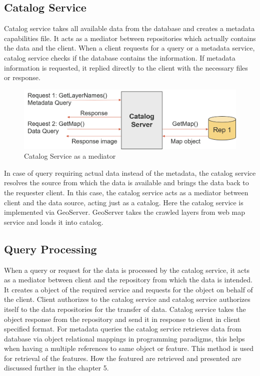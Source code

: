 \subsection{Catalog Service}
Catalog service takes all available data from the database and creates a metadata capabilities file. It acts as a mediator between repositories which actually contains the data and the client. When a client requests for a query or a metadata service, catalog service checks if the database contains the information. If metadata information is requested, it replied directly to the client with the necessary files or response.\\
\begin{figure}[h]
\centering
  \includegraphics[width=\textwidth]{pix/Picture5}
  \caption{Catalog Service as a mediator}
\end{figure}
\par In case of query requiring actual data instead of the metadata, the catalog service resolves the source from which the data is available and brings the data back to the requester client. In this case, the catalog service acts as a mediator between client and the data source, acting just as a catalog. Here the catalog service is implemented via GeoServer. GeoServer takes the crawled layers from web map service and loads it into catalog.

\subsection{Query Processing}
When a query or request for the data is processed by the catalog service, it acts as a mediator between client and the repository from which the data is intended. It creates a object of the required service and requests for the object on behalf of the client. Client authorizes to the catalog service and catalog service authorizes itself to the data repositories for the transfer of data. Catalog service takes the object response from the repository and send it in response to client in client specified format. For metadata queries the catalog service retrieves data from database via object relational mappings in programming paradigms, this helps when having a multiple references to same object or feature. This method is used for retrieval of the features. How the featured are retrieved and presented are discussed further in the chapter 5.


